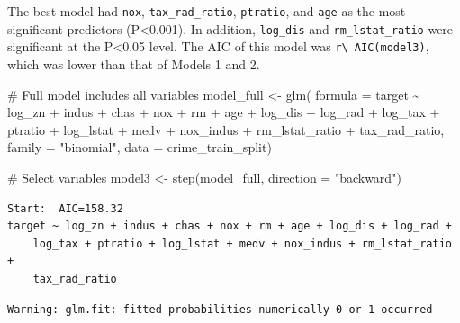 \documentclass[
  11pt]{article}
\newenvironment{Shaded}{\begin{snugshade}}{\end{snugshade}}
\newcommand{\AttributeTok}[1]{\textcolor[rgb]{0.40,0.45,0.13}{#1}}
\newcommand{\CommentTok}[1]{\textcolor[rgb]{0.37,0.37,0.37}{#1}}
\newcommand{\FunctionTok}[1]{\textcolor[rgb]{0.28,0.35,0.67}{#1}}
\newcommand{\NormalTok}[1]{\textcolor[rgb]{0.00,0.23,0.31}{#1}}
\newcommand{\OtherTok}[1]{\textcolor[rgb]{0.00,0.23,0.31}{#1}}
\newcommand{\SpecialCharTok}[1]{\textcolor[rgb]{0.37,0.37,0.37}{#1}}
\newcommand{\StringTok}[1]{\textcolor[rgb]{0.13,0.47,0.30}{#1}}
\begin{document}
The best model had \texttt{nox}, \texttt{tax\_rad\_ratio},
\texttt{ptratio}, and \texttt{age} as the most significant predictors
(P\textless0.001). In addition, \texttt{log\_dis} and
\texttt{rm\_lstat\_ratio} were significant at the P\textless0.05 level.
The AIC of this model was \texttt{r\textbackslash{}\ AIC(model3)}, which
was lower than that of Models 1 and 2.

\begin{Shaded}
\begin{Highlighting}[]
\CommentTok{\# Full model includes all variables}
\NormalTok{model\_full }\OtherTok{\textless{}{-}} \FunctionTok{glm}\NormalTok{(}
  \AttributeTok{formula =}\NormalTok{ target }\SpecialCharTok{\textasciitilde{}}\NormalTok{ log\_zn }\SpecialCharTok{+}\NormalTok{ indus }\SpecialCharTok{+}\NormalTok{ chas }\SpecialCharTok{+}\NormalTok{ nox }\SpecialCharTok{+}\NormalTok{ rm }\SpecialCharTok{+}\NormalTok{ age }\SpecialCharTok{+} 
\NormalTok{                     log\_dis }\SpecialCharTok{+}\NormalTok{ log\_rad }\SpecialCharTok{+}\NormalTok{ log\_tax }\SpecialCharTok{+}\NormalTok{ ptratio }\SpecialCharTok{+}\NormalTok{ log\_lstat }\SpecialCharTok{+}\NormalTok{ medv }\SpecialCharTok{+}
\NormalTok{                     nox\_indus }\SpecialCharTok{+}\NormalTok{ rm\_lstat\_ratio }\SpecialCharTok{+}\NormalTok{ tax\_rad\_ratio,}
  \AttributeTok{family =} \StringTok{"binomial"}\NormalTok{,}
  \AttributeTok{data =}\NormalTok{ crime\_train\_split)}

\CommentTok{\# Select variables}
\NormalTok{model3 }\OtherTok{\textless{}{-}} \FunctionTok{step}\NormalTok{(model\_full, }\AttributeTok{direction =} \StringTok{"backward"}\NormalTok{)}
\end{Highlighting}
\end{Shaded}

\begin{verbatim}
Start:  AIC=158.32
target ~ log_zn + indus + chas + nox + rm + age + log_dis + log_rad + 
    log_tax + ptratio + log_lstat + medv + nox_indus + rm_lstat_ratio + 
    tax_rad_ratio
\end{verbatim}

\begin{verbatim}
Warning: glm.fit: fitted probabilities numerically 0 or 1 occurred
\end{verbatim}
\end{document}
